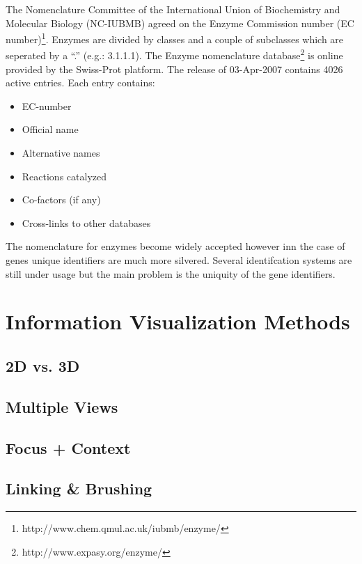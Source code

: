 The Nomenclature Committee of the International Union of Biochemistry and Molecular Biology (NC-IUBMB) agreed on the Enzyme Commission number (EC number)\footnote{http://www.chem.qmul.ac.uk/iubmb/enzyme/}\citep{Bairoch2000}. Enzymes are divided by classes and a couple of subclasses which are seperated by a ``.'' (e.g.: 3.1.1.1). The Enzyme nomenclature database\footnote{http://www.expasy.org/enzyme/} is online provided by the Swiss-Prot platform.
The release of 03-Apr-2007 contains 4026 active entries. 
Each entry contains:
\begin{itemize}
 \item EC-number
 \item Official name
 \item Alternative names
 \item Reactions catalyzed
 \item Co-factors (if any)
 \item Cross-links to other databases
\end{itemize}

The nomenclature for enzymes become widely accepted however inn the case of genes unique identifiers are much more silvered.
Several identifcation systems are still under usage but the main problem is the uniquity of the gene identifiers.


\section{Information Visualization Methods}

\citep{Bederson2003}
\citep{Spence2007}
\citep{Schumann2000}

\subsection{2D vs. 3D}

\subsection{Multiple Views}

\subsection{Focus + Context}

\subsection{Linking \& Brushing}

